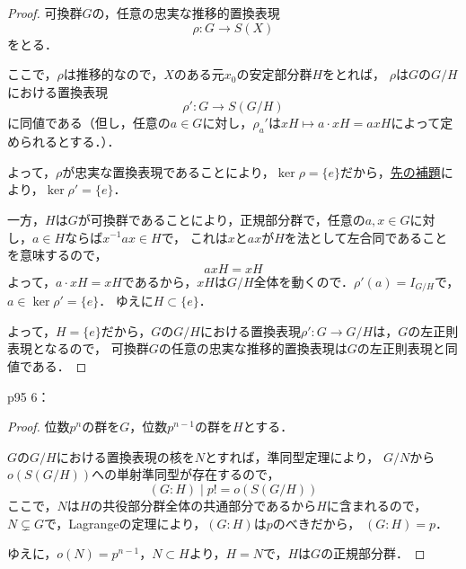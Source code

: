 \documentclass[dvipdfmx,uplatex,11pt]{jsarticle}
\theoremstyle{mytheorem}
\begin{document}
        \begin{leftbar}
            \begin{proof}
                可換群$G$の，任意の忠実な推移的置換表現
                \[
                    \rho \colon G \longrightarrow S(X)
                \]
                をとる．

                ここで，$\rho$は推移的なので，$X$のある元$x_0$の安定部分群$H$をとれば，
                $\rho$は$G$の$G /H$における置換表現
                \[
                    \rho '\colon G \longrightarrow S(G/H)
                \]
                に同値である（但し，任意の$a \in G$に対し，$\rho_a '$は$x H \longmapsto a \cdot xH = axH$によって定められるとする．）．

                よって，$\rho$が忠実な置換表現であることにより，$\ker \rho = \{e\}$だから，\hyperref[lem:p95.4]{先の補題}により，$\ker \rho ' = \{e\}$．

                一方，$H$は$G$が可換群であることにより，正規部分群で，任意の$a,x \in G$に対し，$a \in H$ならば$x^{-1}ax \in H$で，
                これは$x$と$ax$が$H$を法として左合同であることを意味するので，
                \[
                    axH =xH
                \]
                よって，$a \cdot xH = xH$であるから，$xH$は$G/H$全体を動くので．$\rho ' (a)=I_{G/H}$で，$a \in \ker \rho ' =\{e\}$．
                ゆえに$H \subset \{e\}$．

                よって，$H = \{e\}$だから，$G$の$G/H$における置換表現$\rho ' \colon G \longrightarrow G/H$は，$G$の左正則表現となるので，
                可換群$G$の任意の忠実な推移的置換表現は$G$の左正則表現と同値である．
            \end{proof}
        \end{leftbar}

        \newpage

        p95 6：
        \begin{leftbar}
            \begin{proof}
                位数$p^n$の群を$G$，位数$p^{n-1}$の群を$H$とする．

                $G$の$G /H$における置換表現の核を$N$とすれば，準同型定理により，
                $G/N$から$o(S(G/H))$への単射準同型が存在するので，
                \[
                    (G :H) \mid p! = o(S(G/H))
                \]
                ここで，$N$は$H$の共役部分群全体の共通部分であるから$H$に含まれるので，$N \subsetneq G$で，Lagrangeの定理により，$(G:H)$は$p$のべきだから，
                $(G:H)=p$．

                ゆえに，$o(N)=p^{n-1}$，$N \subset H$より，$H=N$で，$H$は$G$の正規部分群．
            \end{proof}
        \end{leftbar}
\end{document}
